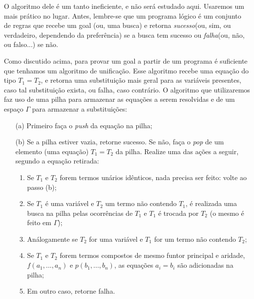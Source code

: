 \documentclass{article}
\theoremstyle{remark}
\theoremstyle{theorem}
\begin{document}
O algoritmo dele é um tanto ineficiente, e não será estudado aqui. Usaremos um mais prático no lugar. Antes, lembre-se que um programa lógico é um conjunto de regras que recebe um goal (ou, uma busca) e retorna {\it sucesso}(ou, sim, ou verdadeiro, dependendo da preferência) se a busca tem sucesso ou {\it falha}(ou, não, ou falso...) se não.

Como discutido acima, para provar um goal a partir de um programa é suficiente que tenhamos um algoritmo de unificação. Esse algoritmo recebe uma equação do tipo $T_1 = T_2$, e retorna uma substituição mais geral para as variáveis presentes, caso tal substituição exista, ou falha, caso contrário. O algoritmo que utilizaremos faz uso de uma pilha para armazenar as equações a serem resolvidas e de um espaço
$\Gamma$ para armazenar a substituições:

\begin{itemize}
    \item[(a)] Primeiro faça o \textit{push} da equação na pilha;
    \item[(b)] Se a pilha estiver vazia, retorne sucesso. Se não, faça o \textit{pop} de um elemento (uma equação) $T_1 = T_2$ da pilha. Realize uma das ações a seguir, segundo a equação retirada:
      \begin{enumerate}
        \item Se $T_1$ e $T_2$ forem termos unários idênticos, nada precisa ser feito: volte ao passo (b);
        \item Se $T_1$ é uma variável e $T_2$ um termo não contendo $T_1$, é realizada uma busca na pilha pelas ocorrências de $T_1$ e $T_1$ é trocada por $T_2$ (o mesmo é feito em $\Gamma$);
        \item Análogamente se $T_2$ for uma variável e $T_1$ for um termo não contendo $T_2$;
        \item Se $T_1$ e $T_2$ forem termos compostos de mesmo funtor principal e aridade, $f(a_1, ..., a_n)$ e $p(b_1, ..., b_n)$, as equações $a_i = b_i$ são adicionadas na pilha;
        \item Em outro caso, retorne falha.
      \end{enumerate}
\end{itemize}
\end{document}
